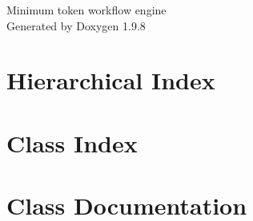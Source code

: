 \documentclass[twoside]{book}
\newcommand{\+}{\discretionary{\mbox{\scriptsize$\hookleftarrow$}}{}{}}
\newcommand{\clearemptydoublepage}{%
    \newpage{\pagestyle{empty}\cleardoublepage}%
  }
\begin{document}
  \raggedbottom
    \hypersetup{pageanchor=false,
                bookmarksnumbered=true,
                pdfencoding=unicode
               }
  \begin{titlepage}
  \vspace*{7cm}
  \begin{center}%
  {\Large Minimum token workflow engine}\\
  \vspace*{1cm}
  {\large Generated by Doxygen 1.9.8}\\
  \end{center}
  \end{titlepage}
  \clearemptydoublepage
  \tableofcontents
  \clearemptydoublepage
  \hypersetup{pageanchor=true}
\chapter{Hierarchical Index}

\chapter{Class Index}

\chapter{Class Documentation}














  \backmatter
  \newpage
  \clearemptydoublepage
  \printindex
\end{document}
